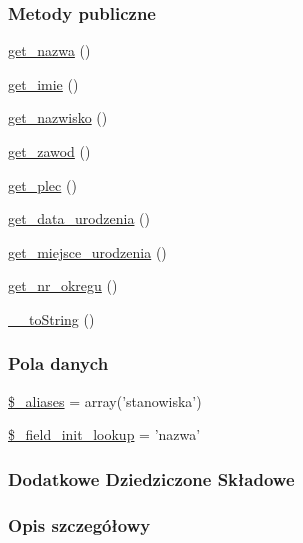 \subsubsection*{Metody publiczne}
\begin{DoxyCompactItemize}
\item 
\hyperlink{classep___stanowisko_ac0818f0049d7b84f08f77128f54cee36}{get\-\_\-nazwa} ()
\item 
\hyperlink{classep___stanowisko_ac4b0c85dc2a130038f2d118dbd0c3d77}{get\-\_\-imie} ()
\item 
\hyperlink{classep___stanowisko_abdd1d7ff92508da7f748ba1feec97af0}{get\-\_\-nazwisko} ()
\item 
\hyperlink{classep___stanowisko_af80ca8310b60004454dd02a387deaa2c}{get\-\_\-zawod} ()
\item 
\hyperlink{classep___stanowisko_ac7f9af5c3fa024e4c26a7b6bd4ce4bb4}{get\-\_\-plec} ()
\item 
\hyperlink{classep___stanowisko_a880b240cd2d8c336fd1709bf0cb1ae2c}{get\-\_\-data\-\_\-urodzenia} ()
\item 
\hyperlink{classep___stanowisko_ac57c08ec5e394a19c5bd9280c8376182}{get\-\_\-miejsce\-\_\-urodzenia} ()
\item 
\hyperlink{classep___stanowisko_a2645a9f0aa5b0ccc482943348c033d0a}{get\-\_\-nr\-\_\-okregu} ()
\item 
\hyperlink{classep___stanowisko_a7516ca30af0db3cdbf9a7739b48ce91d}{\-\_\-\-\_\-to\-String} ()
\end{DoxyCompactItemize}
\subsubsection*{Pola danych}
\begin{DoxyCompactItemize}
\item 
\hyperlink{classep___stanowisko_ab4e31d75f0bc5d512456911e5d01366b}{\$\-\_\-aliases} = array('stanowiska')
\item 
\hyperlink{classep___stanowisko_a4a4d54ae35428077a7c61ec8a5139af3}{\$\-\_\-field\-\_\-init\-\_\-lookup} = 'nazwa'
\end{DoxyCompactItemize}
\subsubsection*{Dodatkowe Dziedziczone Składowe}


\subsubsection{Opis szczegółowy}


